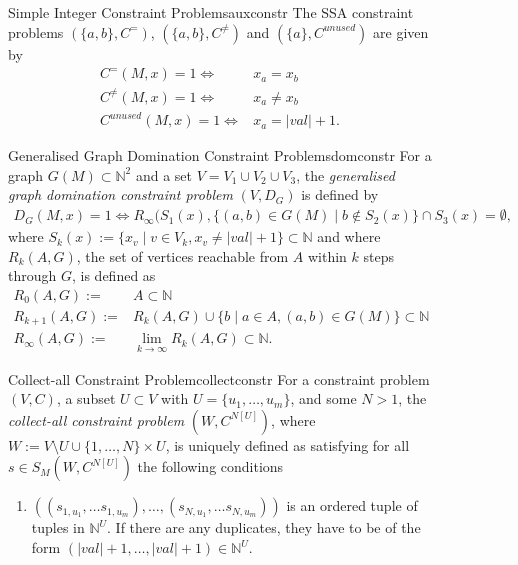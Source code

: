 \begin{figure}[p]
    \begin{definition}{Simple Integer Constraint Problems}{auxconstr}
        The SSA constraint problems $(\{a,b\}, C^=)$, $(\{a,b\}, C^{\neq})$
        and $(\{a\}, C^{unused})$ are given by
        \begin{align*}
        C^=(M,x)=1\iff{}&x_a=x_b\\
        C^{\neq}(M,x)=1\iff{}&x_a\neq x_b\\
        C^{unused}(M,x)=1\iff{}&x_a=|val|+1.
        \end{align*}
    \end{definition}
    \begin{definition}{Generalised Graph Domination Constraint Problems}{domconstr}
        For a graph $G(M)\subset\mathbb N^2$ and a set $V=V_1\cup V_2\cup V_3$,
        the {\em generalised graph domination constraint problem}
        $(V,D_G)$ is defined by
        \begin{align*}
            D_G(M,x)=1\iff R_{\infty}(S_1(x),\{(a,b)\in G(M)\mid b\notin S_2(x)\}\cap S_3(x)=\emptyset,
        \end{align*}
        where $S_k(x):=\{x_v\mid v\in V_k, x_v\neq |val|+1\}\subset\mathbb N$
        and where $R_k(A,G)$, the set of vertices reachable from $A$ within $k$
        steps through $G$, is defined as
        \begin{align*}
            R_0(A,G):={}&A\subset\mathbb N\\
            R_{k+1}(A,G):={}&R_k(A,G)\cup\{b\mid a\in A, (a,b)\in G(M)\}\subset\mathbb N\\
            R_\infty(A,G):={}&\lim_{k\rightarrow\infty}R_k(A,G)\subset\mathbb N.
        \end{align*}
    \end{definition}
    \begin{definition}{Collect-all Constraint Problem}{collectconstr}
        For a constraint problem $(V,C)$, a subset $U\subset V$ with
        $U=\{u_1,\dots,u_m\}$, and some $N>1$, the
        {\em collect-all constraint problem} $(W, C^{N[U]})$, where
        $W:=V\setminus U\cup\{1,\dots,N\}\times U$, is uniquely defined
        as satisfying for all $s\in S_M(W,C^{N[U]})$ the following conditions
        \begin{enumerate}
        \item $((s_{1,u_1},\dots s_{1,u_m}),\dots,(s_{N,u_1},\dots s_{N,u_m}))$ is an ordered tuple of tuples in $\mathbb N^U$.
              If there are any duplicates, they have to be of the form $(|val|+1,\dots,|val|+1)\in\mathbb N^U$.

\end{enumerate}
\end{definition}
\end{figure}
